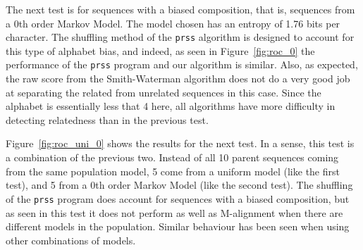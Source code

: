 \documentclass[a4paper,11pt,oneside]{article}
\begin{document}
The next test is for sequences with a biased composition, that is, sequences
from a 0th order Markov Model.  The model chosen has an entropy of 1.76 bits
per character.  The shuffling method of the \verb!prss! algorithm is designed
to account for this type of alphabet bias, and indeed, as seen in
Figure~\ref{fig:roc_0} the performance of the \verb!prss! program and our
algorithm is similar.  Also, as expected, the raw score from the
Smith-Waterman algorithm does not do a very good job at separating the related
from unrelated sequences in this case.  Since the alphabet is essentially less
that 4 here, all algorithms have more difficulty in detecting relatedness than
in the previous test.


Figure~\ref{fig:roc_uni_0} shows the results for the next test.  In a sense,
this test is a combination of the previous two.  Instead of all 10 parent
sequences coming from the same population model, 5 come from a uniform model
(like the first test), and 5 from a 0th order Markov Model (like the second
test).  The shuffling of the \verb!prss! program does account for sequences
with a biased composition, but as seen in this test it does not perform as
well as M-alignment when there are different models in the population.
Similar behaviour has been seen when using other combinations of models.

\end{document}
